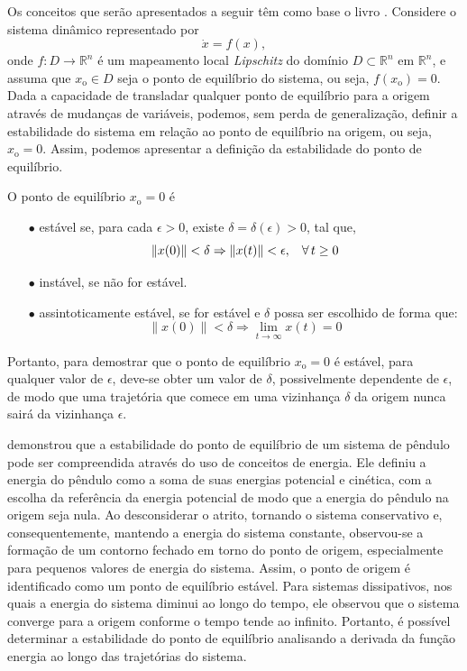 Os conceitos que serão apresentados a seguir têm como base o livro \cite{khalil2002}. Considere o sistema dinâmico representado por \begin{equation}\dot{x} = f(x), \end{equation} onde $f: D \rightarrow \mathbb{R}^n$ é um mapeamento local \textit{Lipschitz} do domínio $D \subset \mathbb{R}^n$ em $\mathbb{R}^n$, e assuma que $x_{\mathrm{o}} \in D$ seja o ponto de equilíbrio do sistema, ou seja, $f(x_{\mathrm{o}}) = 0$. Dada a capacidade de transladar qualquer ponto de equilíbrio para a origem através de mudanças de variáveis, podemos, sem perda de generalização, definir a estabilidade do sistema em relação ao ponto de equilíbrio na origem, ou seja, $x_{\mathrm{o}} = 0$. Assim, podemos apresentar a definição da estabilidade do ponto de equilíbrio.

\begin{definition}
  O ponto de equilíbrio $x_{\mathrm{o}} = 0$ é

  \begin{enumerate}
    \item[$\bullet$] estável se, para cada $\epsilon > 0$, existe $\delta = \delta(\epsilon) > 0$, tal que,
          $$ \lVert x(0)\rVert < \delta \Rightarrow \lVert x(t)\rVert < \epsilon, \hspace{0.3cm} \forall \, t \geq 0$$
    \item[$\bullet$] instável, se não for estável.
    \item[$\bullet$] assintoticamente estável, se for estável e $\delta$ possa   ser escolhido de forma que:
          $$ \lVert x(0)\rVert < \delta \Rightarrow \lim_{t \rightarrow \infty}x(t) = 0$$
  \end{enumerate}
\end{definition}

Portanto, para demostrar que o ponto de equilíbrio $x_{\mathrm{o}} = 0$ é estável, para qualquer valor de $\epsilon$, deve-se obter um valor de $\delta$, possivelmente dependente de $\epsilon$, de modo que uma trajetória que comece em uma vizinhança $\delta$ da origem nunca sairá da vizinhança $\epsilon$.

\cite{khalil2002} demonstrou que a estabilidade do ponto de equilíbrio de um sistema de pêndulo pode ser compreendida através do uso de conceitos de energia. Ele definiu a energia do pêndulo como a soma de suas energias potencial e cinética, com a escolha da referência da energia potencial de modo que a energia do pêndulo na origem seja nula. Ao desconsiderar o atrito, tornando o sistema conservativo e, consequentemente, mantendo a energia do sistema constante, observou-se a formação de um contorno fechado em torno do ponto de origem, especialmente para pequenos valores de energia do sistema. Assim, o ponto de origem é identificado como um ponto de equilíbrio estável. Para sistemas dissipativos, nos quais a energia do sistema diminui ao longo do tempo, ele observou que o sistema converge para a origem conforme o tempo tende ao infinito. Portanto, é possível determinar a estabilidade do ponto de equilíbrio analisando a derivada da função energia ao longo das trajetórias do sistema.

